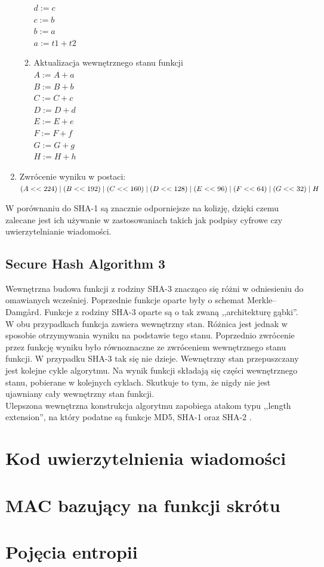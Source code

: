 \begin{enumerate}
\begin{enumerate}
		        $d := c$ \\
		        $c := b$ \\
		        $b := a$ \\
		        $a := t1 + t2$
			\item Aktualizacja wewnętrznego stanu funkcji \\
				$A := A + a$ \\
				$B := B + b$ \\
				$C := C + c$ \\
				$D := D + d$ \\
				$E := E + e$ \\
				$F := F + f$ \\
				$G := G + g$ \\
				$H := H + h$ 
		\end{enumerate}
	\item Zwrócenie wyniku w postaci: \\
		$(A << 224) \mathrel{|} (B << 192) \mathrel{|} (C << 160) \mathrel{|} \\ 
		 (D << 128) \mathrel{|} (E << 96) \mathrel{|} (F << 64) \mathrel{|} (G << 32) \mathrel{|} H$
\end{enumerate}
W porównaniu do SHA-1 są znacznie odporniejsze na kolizję, dzięki czemu zalecane jest ich używanie w zastosowaniach takich jak podpisy cyfrowe czy uwierzytelnianie wiadomości.

\subsection{Secure Hash Algorithm 3}
Wewnętrzna budowa funkcji z rodziny SHA-3 znacząco się różni w odniesieniu do omawianych wcześniej. 
Poprzednie funkcje oparte były o schemat Merkle–Damgård. Funkcje z rodziny SHA-3 oparte są o tak zwaną ,,architekturę gąbki''. W obu przypadkach funkcja zawiera wewnętrzny stan. Różnica jest jednak w sposobie otrzymywania wyniku na podstawie tego stanu. Poprzednio zwrócenie przez funkcję wyniku było równoznaczne ze zwróceniem wewnętrznego stanu funkcji. W przypadku SHA-3 tak się nie dzieje. Wewnętrzny stan przepuszczany jest kolejne cykle algorytmu. Na wynik funkcji składają się części wewnętrznego stanu, pobierane w kolejnych cyklach. Skutkuje to tym, że nigdy nie jest ujawniany cały wewnętrzny stan funkcji. \\
Ulepszona wewnętrzna konstrukcja algorytmu zapobiega atakom typu ,,length extension'', na który podatne są funkcje MD5, SHA-1 oraz SHA-2 \cite{keccak}.

\section{Kod uwierzytelnienia wiadomości}

\section{MAC bazujący na funkcji skrótu}

\section{Pojęcia entropii}
